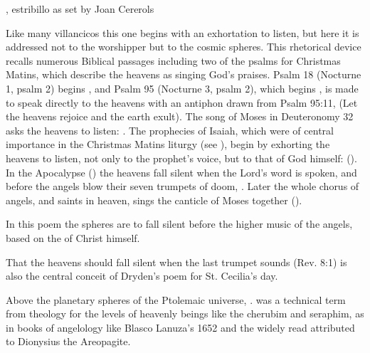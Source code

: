 {, estribillo as set by Joan Cererols}

Like many villancicos this one begins with an exhortation to listen, but here it
is addressed not to the worshipper but to the cosmic spheres. 
This rhetorical device recalls numerous Biblical passages including two of the
psalms for Christmas Matins, which describe the heavens as singing God's
praises.
Psalm 18 (Nocturne 1, psalm 2) begins , and Psalm 95 (Nocturne 3, psalm 2), which begins , is made to speak directly to the heavens
with an antiphon drawn from Psalm 95:11,  (Let the heavens rejoice and the earth exult).%
    \Autocite[169--179]{Catholic:Breviarium1631}
The song of Moses in Deuteronomy 32 asks the heavens to listen: . 
The prophecies of Isaiah, which were of central importance in the Christmas
Matins liturgy (see ), begin by exhorting the heavens to
listen, not only to the prophet's voice, but to that of God himself:
 ().
In the Apocalypse () the heavens fall silent when the
Lord's word is spoken, and before the angels blow their seven trumpets of
doom, .
Later the whole chorus of angels,  and saints in
heaven, sings the canticle of Moses together ().


In this poem the spheres are to fall silent before the higher music of the
angels, based on the  of Christ himself.%
\begin{Footnote}
    That the heavens should fall silent when the last trumpet sounds (Rev. 8:1)
    is also the central conceit of Dryden's poem for St. Cecilia's day. 
\end{Footnote}
Above the planetary spheres of the Ptolemaic universe, . 
 was a technical term from theology for the levels of
heavenly beings like the cherubim and seraphim, as in books of angelology like
Blasco Lanuza's 1652  and
the widely read  attributed to Dionysius the
Areopagite.%
    \Autocite[See also][, 393]{Kircher:Musurgia}

